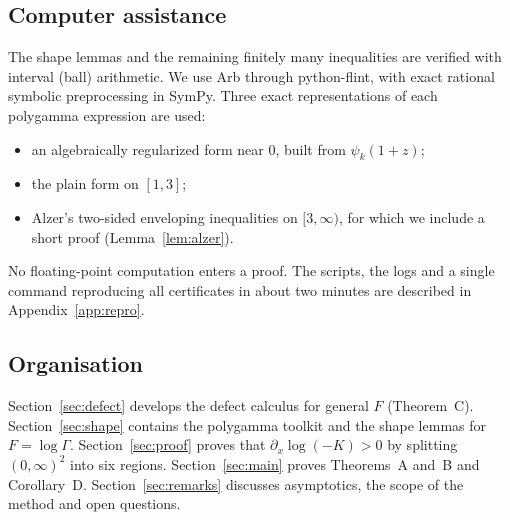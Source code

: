 \documentclass[11pt,a4paper]{article}
\theoremstyle{definition}
\theoremstyle{remark}
\begin{document}
\subsection{Computer assistance}
The shape lemmas and the remaining finitely many inequalities are verified with interval (ball) arithmetic. We use Arb \cite{Joh17} through python-flint, with exact rational symbolic preprocessing in SymPy. Three exact representations of each polygamma expression are used:
\begin{itemize}
\item an algebraically regularized form near $0$, built from $\psi_k(1+z)$;
\item the plain form on $[1,3]$;
\item Alzer's two-sided enveloping inequalities \cite{Alz97} on $[3,\infty)$, for which we include a short proof (Lemma~\ref{lem:alzer}).
\end{itemize}
No floating-point computation enters a proof. The scripts, the logs and a single command reproducing all certificates in about two minutes are described in Appendix~\ref{app:repro}.

\subsection{Organisation}
Section~\ref{sec:defect} develops the defect calculus for general $F$ (Theorem~C). Section~\ref{sec:shape} contains the polygamma toolkit and the shape lemmas for $F=\log\Gamma$. Section~\ref{sec:proof} proves that $\partial_x\log(-K)>0$ by splitting $(0,\infty)^2$ into six regions. Section~\ref{sec:main} proves Theorems~A and~B and Corollary~D. Section~\ref{sec:remarks} discusses asymptotics, the scope of the method and open questions.
\end{document}
